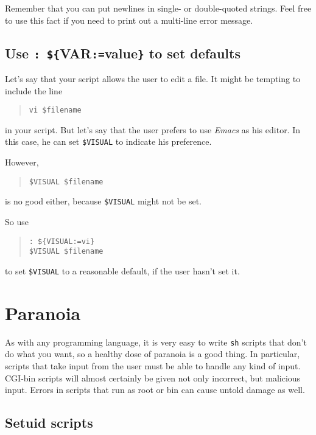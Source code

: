 \documentclass{article}
\newcommand{\fname}[1]{\textsl{#1}}
\newcommand{\code}[1]{\texttt{#1}}
\newcommand{\sh}{\code{sh}}
\begin{document}
	Remember that you can put newlines in single- or double-quoted
strings. Feel free to use this fact if you need to print out a
multi-line error message.

\subsection{Use \code{: \$\{}VAR\code{:=}value\code{\}} to set defaults}

	Let's say that your script allows the user to edit a file. It
might be tempting to include the line
\begin{quote}
\begin{verbatim}
vi $filename
\end{verbatim}%
\end{quote}
in your script. But let's say that the user prefers to use
\fname{Emacs} as his editor. In this case, he can set \code{\$VISUAL}
to indicate his preference.

	However,
\begin{quote}
\begin{verbatim}
$VISUAL $filename
\end{verbatim}
\end{quote}
is no good either, because \code{\$VISUAL} might not be set.

	So use
\begin{quote}
\begin{verbatim}
: ${VISUAL:=vi}
$VISUAL $filename
\end{verbatim}%
\end{quote}
to set \code{\$VISUAL} to a reasonable default, if the user hasn't set
it.

\section{Paranoia}

	As with any programming language, it is very easy to write \sh
scripts that don't do what you want, so a healthy dose of paranoia is
a good thing. In particular, scripts that take input from the user
must be able to handle any kind of input. CGI-bin scripts will almost
certainly be given not only incorrect, but malicious input. Errors in
scripts that run as root or bin can cause untold damage as well.

\subsection{Setuid scripts}
\end{document}

